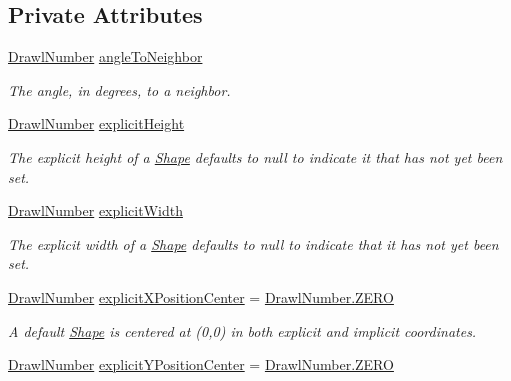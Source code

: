 \subsection*{Private Attributes}
\begin{DoxyCompactItemize}
\item 
\hyperlink{classcom_1_1aarrelaakso_1_1drawl_1_1_drawl_number}{Drawl\+Number} \hyperlink{classcom_1_1aarrelaakso_1_1drawl_1_1_shape_a3825489dc33e20e34a2a4153b6f263f5}{angle\+To\+Neighbor}
\begin{DoxyCompactList}\small\item\em The angle, in degrees, to a neighbor. \end{DoxyCompactList}\item 
\hyperlink{classcom_1_1aarrelaakso_1_1drawl_1_1_drawl_number}{Drawl\+Number} \hyperlink{classcom_1_1aarrelaakso_1_1drawl_1_1_shape_a464d9ea72aa8d99a1054c5dafdde680f}{explicit\+Height}
\begin{DoxyCompactList}\small\item\em The explicit height of a \hyperlink{classcom_1_1aarrelaakso_1_1drawl_1_1_shape}{Shape} defaults to {\ttfamily null} to indicate it that has not yet been set. \end{DoxyCompactList}\item 
\hyperlink{classcom_1_1aarrelaakso_1_1drawl_1_1_drawl_number}{Drawl\+Number} \hyperlink{classcom_1_1aarrelaakso_1_1drawl_1_1_shape_a639432fb50ca84edb9f83910e136ee16}{explicit\+Width}
\begin{DoxyCompactList}\small\item\em The explicit width of a \hyperlink{classcom_1_1aarrelaakso_1_1drawl_1_1_shape}{Shape} defaults to {\ttfamily null} to indicate that it has not yet been set. \end{DoxyCompactList}\item 
\hyperlink{classcom_1_1aarrelaakso_1_1drawl_1_1_drawl_number}{Drawl\+Number} \hyperlink{classcom_1_1aarrelaakso_1_1drawl_1_1_shape_aeb26b2d34df1c2955590030161431622}{explicit\+X\+Position\+Center} = \hyperlink{classcom_1_1aarrelaakso_1_1drawl_1_1_drawl_number_a14c9ceff1fb3f2bd5c3b380183db933a}{Drawl\+Number.\+Z\+E\+RO}
\begin{DoxyCompactList}\small\item\em A default \hyperlink{classcom_1_1aarrelaakso_1_1drawl_1_1_shape}{Shape} is centered at (0,0) in both explicit and implicit coordinates. \end{DoxyCompactList}\item 
\hyperlink{classcom_1_1aarrelaakso_1_1drawl_1_1_drawl_number}{Drawl\+Number} \hyperlink{classcom_1_1aarrelaakso_1_1drawl_1_1_shape_a74b4484039f8ba087a4d560f314ccda4}{explicit\+Y\+Position\+Center} = \hyperlink{classcom_1_1aarrelaakso_1_1drawl_1_1_drawl_number_a14c9ceff1fb3f2bd5c3b380183db933a}{Drawl\+Number.\+Z\+E\+RO}

\end{DoxyCompactItemize}
